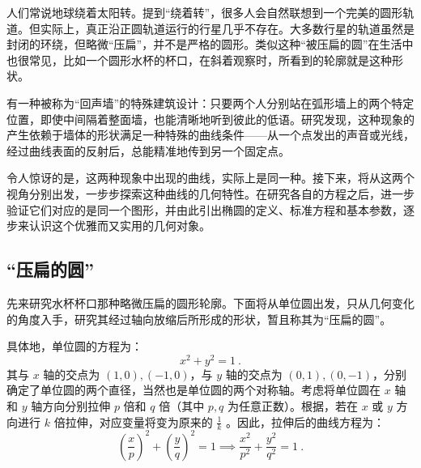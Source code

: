 
\begin{issues}
\issueDraft
\end{issues}


人们常说地球绕着太阳转。提到“绕着转”，很多人会自然联想到一个完美的圆形轨道。但实际上，真正沿正圆轨道运行的行星几乎不存在。大多数行星的轨道虽然是封闭的环绕，但略微“压扁”，并不是严格的圆形。类似这种“被压扁的圆”在生活中也很常见，比如一个圆形水杯的杯口，在斜着观察时，所看到的轮廓就是这种形状。

有一种被称为“回声墙”的特殊建筑设计：只要两个人分别站在弧形墙上的两个特定位置，即使中间隔着整面墙，也能清晰地听到彼此的低语。研究发现，这种现象的产生依赖于墙体的形状满足一种特殊的曲线条件——从一个点发出的声音或光线，经过曲线表面的反射后，总能精准地传到另一个固定点。

令人惊讶的是，这两种现象中出现的曲线，实际上是同一种。接下来，将从这两个视角分别出发，一步步探索这种曲线的几何特性。在研究各自的方程之后，进一步验证它们对应的是同一个图形，并由此引出椭圆的定义、标准方程和基本参数，逐步来认识这个优雅而又实用的几何对象。

\subsection{“压扁的圆”}

先来研究水杯杯口那种略微压扁的圆形轮廓。下面将从单位圆出发，只从几何变化的角度入手，研究其经过轴向放缩后所形成的形状，暂且称其为“压扁的圆”。

具体地，单位圆的方程为：
\begin{equation}
x^2 + y^2 = 1~.
\end{equation}
其与 $x$ 轴的交点为 $(1, 0), (-1, 0)$，与 $y$ 轴的交点为 $(0, 1), (0, -1)$，分别确定了单位圆的两个直径，当然也是单位圆的两个对称轴。考虑将单位圆在 $x$ 轴和 $y$ 轴方向分别拉伸 $p$ 倍和 $q$ 倍（其中 $p, q$ 为任意正数）。根据，若在 $x$ 或 $y$ 方向进行 $k$ 倍拉伸，对应变量将变为原来的 $\displaystyle\frac{1}{k}$ 。因此，拉伸后的曲线方程为：
\begin{equation}\label{eq_Elips3_2}
\left(\frac{x}{p}\right)^2 + \left(\frac{y}{q}\right)^2 = 1\implies\frac{x^2}{p^2} + \frac{y^2}{q^2} = 1~.
\end{equation}

